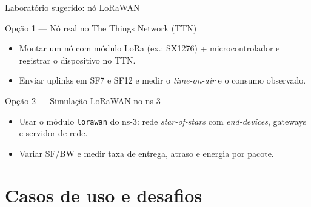 \documentclass[aspectratio=169,11pt]{beamer}
\begin{document}
\begin{frame}{Laboratório sugerido: nó LoRaWAN}
  \begin{block}{Opção 1 --- Nó real no The Things Network (TTN)}
    \begin{itemize}
      \item Montar um nó com módulo LoRa (ex.: SX1276) + microcontrolador e registrar o dispositivo no TTN.
      \item Enviar uplinks em SF7 e SF12 e medir o \emph{time-on-air} e o consumo observado.
    \end{itemize}
  \end{block}
  \begin{block}{Opção 2 --- Simulação LoRaWAN no ns-3}
    \begin{itemize}
      \item Usar o módulo \texttt{lorawan} do ns-3: rede \emph{star-of-stars} com \emph{end-devices}, gateways e servidor de rede.
      \item Variar SF/BW e medir taxa de entrega, atraso e energia por pacote.
    \end{itemize}
  \end{block}
\end{frame}

\section{Casos de uso e desafios}
\end{document}
